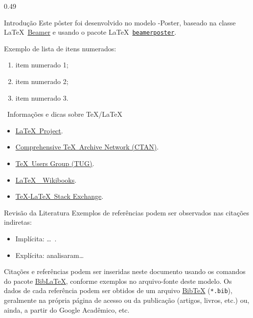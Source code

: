 \documentclass[%
  t,%
  onlytextwidth,%
  compress,%
  xcolor = table,%
  english,%
  brazilian,%
]{beamer}
\begin{document}
\begin{frame}
\begin{columns}%
\begin{column}{0.49\textwidth}%
\begin{block}{Introdução}%
Este pôster foi desenvolvido no modelo \UTFPR-Poster, baseado na classe \LaTeX\ \href{https://www.ctan.org/pkg/beamer/}{Beamer\LinkIcon} e usando o pacote \LaTeX\ \href{https://ctan.org/pkg/beamerposter/}{\texttt{beamerposter}\LinkIcon}.\par%
Exemplo de lista de itens numerados:
\begin{enumerate}
\item item numerado 1;
\item item numerado 2;
\item item numerado 3.
\end{enumerate}
\begin{alertblock}{\faInfoCircle\ Informações e dicas sobre \TeX/\LaTeX}%
\begin{itemize}
\item \href{https://www.latex-project.org/}{\LaTeX\ Project\LinkIcon}.
\item \href{https://www.ctan.org/}{Comprehensive \TeX\ Archive Network (CTAN)\LinkIcon}.
\item \href{https://www.tug.org/}{\TeX\ Users Group (TUG)\LinkIcon}.
\item \href{https://en.wikibooks.org/wiki/LaTeX/}{\LaTeX\ \textemdash\ Wikibooks\LinkIcon}.
\item \href{https://tex.stackexchange.com/}{\TeX-\LaTeX\ Stack Exchange\LinkIcon}.
\end{itemize}
\end{alertblock}%
\end{block}%
\begin{block}{Revisão da Literatura}%
Exemplos de referências podem ser observados nas citações indiretas:
\begin{itemize}
\item Implícita: \ldots\ \cite{Ekenstein1997}.
\item Explícita: \textcite{Wizentier1992} analisaram\ldots%
\end{itemize}
Citações e referências podem ser inseridas neste documento usando os comandos do pacote \href{https://ctan.org/pkg/biblatex/}{Bib\LaTeX\LinkIcon}, conforme exemplos no arquivo-fonte deste modelo.
Os dados de cada referência podem ser obtidos de um arquivo \href{https://www.bibtex.org/}{Bib\TeX\LinkIcon} (\texttt{*.bib}), geralmente na própria página de acesso ou  da publicação (artigos, livros, etc.) ou, ainda, a partir do Google Acadêmico, etc.

\end{block}
\end{column}
\end{columns}
\end{frame}
\end{document}
